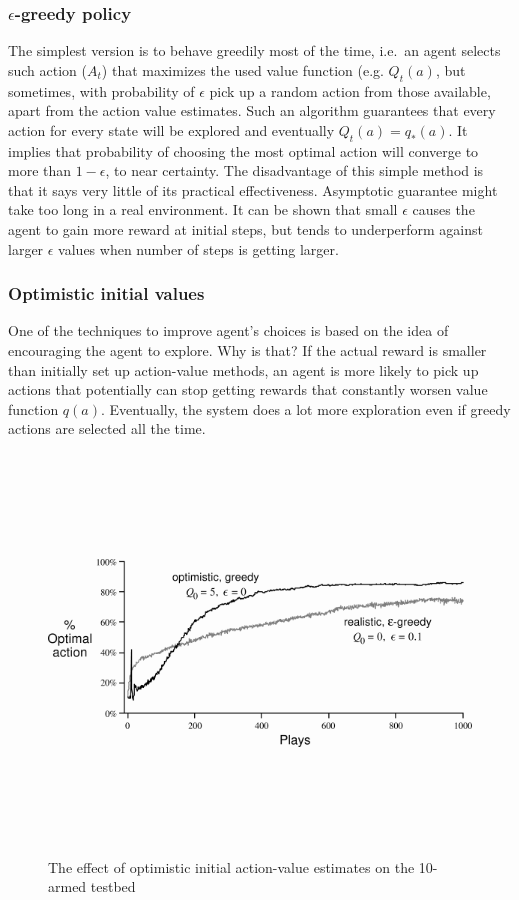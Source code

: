 \documentclass[]{article}
\begin{document}
\subsubsection{\texorpdfstring{\(\epsilon\)-greedy
policy}{\textbackslash{}epsilon-greedy policy}}\label{epsilon-greedy-policy}

The simplest version is to behave greedily most of the time, i.e.~an
agent selects such action (\(A_t\)) that maximizes the used value
function (e.g. \(Q_t(a)\), but sometimes, with probability of
\(\epsilon\) pick up a random action from those available, apart from
the action value estimates. Such an algorithm guarantees that every
action for every state will be explored and eventually
\(Q_t(a)=q_*(a)\). It implies that probability of choosing the most
optimal action will converge to more than \(1-\epsilon\), to near
certainty. The disadvantage of this simple method is that it says very
little of its practical effectiveness. Asymptotic guarantee might take
too long in a real environment. It can be shown that small \(\epsilon\)
causes the agent to gain more reward at initial steps, but tends to
underperform against larger \(\epsilon\) values when number of steps is
getting larger.

\subsubsection{Optimistic initial
values}\label{optimistic-initial-values}

One of the techniques to improve agent's choices is based on the idea of
encouraging the agent to explore. Why is that? If the actual reward is
smaller than initially set up action-value methods, an agent is more
likely to pick up actions that potentially can stop getting rewards that
constantly worsen value function \(q(a)\). Eventually, the system does a
lot more exploration even if greedy actions are selected all the time.

\begin{figure}
\centering
\includegraphics[height=4.16667in]{../img/optimistic_initial_values.png}
\caption{The effect of optimistic initial action-value estimates on the
10-armed testbed}
\end{figure}
\end{document}
